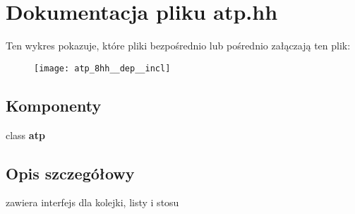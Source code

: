 \section{Dokumentacja pliku atp.\+hh}
\label{atp_8hh}
Ten wykres pokazuje, które pliki bezpośrednio lub pośrednio załączają ten plik\+:\nopagebreak
\begin{figure}[H]
\begin{center}
\leavevmode
\texttt{[image: atp\_8hh\_\_dep\_\_incl]}
\end{center}
\end{figure}
\subsection*{Komponenty}
\begin{DoxyCompactItemize}
\item 
class {\bf atp}
\end{DoxyCompactItemize}


\subsection{Opis szczegółowy}
zawiera interfejs dla kolejki, listy i stosu 